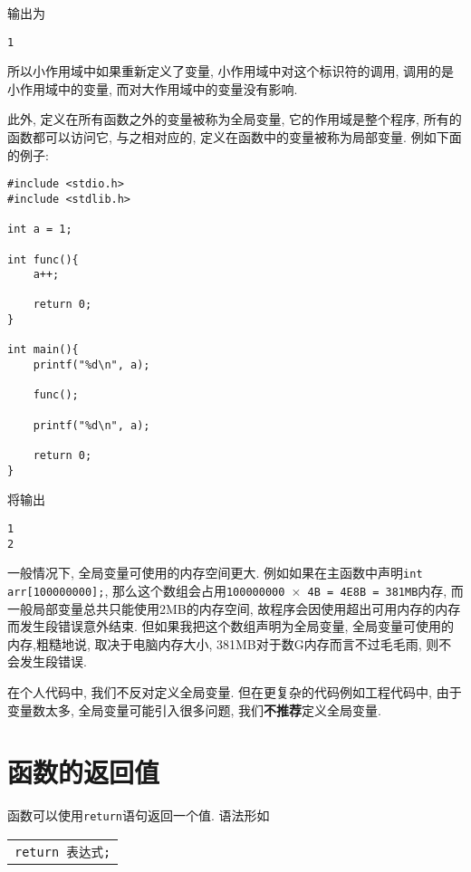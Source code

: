         输出为
\begin{lstlisting}
1
\end{lstlisting}
        所以小作用域中如果重新定义了变量, 小作用域中对这个标识符的调用, 调用的是小作用域中的变量, 而对大作用域中的变量没有影响.

        此外, 定义在所有函数之外的变量被称为全局变量, 它的作用域是整个程序, 所有的函数都可以访问它, 与之相对应的, 定义在函数中的变量被称为局部变量. 例如下面的例子:
\begin{lstlisting}
#include <stdio.h>
#include <stdlib.h>

int a = 1;

int func(){
    a++;

    return 0;
}

int main(){
    printf("%d\n", a);

    func();

    printf("%d\n", a);
    
    return 0;
}
\end{lstlisting}

        将输出
\begin{lstlisting}
1
2
\end{lstlisting}

        \begin{sloppypar}
        一般情况下, 全局变量可使用的内存空间更大. 例如如果在主函数中声明\texttt{int arr[100000000];}, 那么这个数组会占用\texttt{100000000 $\times$ 4B = 4E8B = 381MB}内存, 而一般局部变量总共只能使用2MB的内存空间, 故程序会因使用超出可用内存的内存而发生段错误意外结束. 但如果我把这个数组声明为全局变量, 全局变量可使用的内存,粗糙地说, 取决于电脑内存大小, 381MB对于数G内存而言不过毛毛雨, 则不会发生段错误.
        \end{sloppypar}

        在个人代码中, 我们不反对定义全局变量. 但在更复杂的代码例如工程代码中, 由于变量数太多, 全局变量可能引入很多问题, 我们\textbf{不推荐}定义全局变量.

    \section{函数的返回值}
        函数可以使用\texttt{return}语句返回一个值. 语法形如
        \begin{center}
        \begin{longtable}{l}
            \texttt{return 表达式;}
        \end{longtable}
        \end{center}

